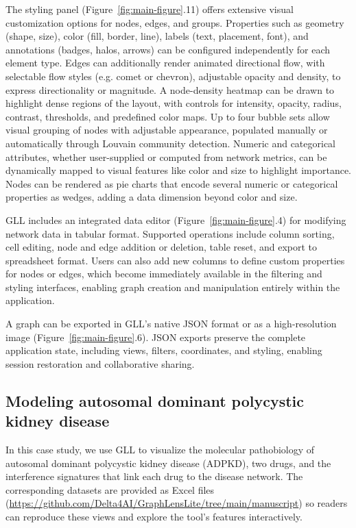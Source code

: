 The styling panel (Figure~\ref{fig:main-figure}.11) offers extensive visual customization options for nodes, edges, and groups. Properties such as geometry (shape, size), color (fill, border, line), labels (text, placement, font), and annotations (badges, halos, arrows) can be configured independently for each element type. Edges can additionally render animated directional flow, with selectable flow styles (e.g. comet or chevron), adjustable opacity and density, to express directionality or magnitude. A node-density heatmap can be drawn to highlight dense regions of the layout, with controls for intensity, opacity, radius, contrast, thresholds, and predefined color maps. Up to four bubble sets allow visual grouping of nodes with adjustable appearance, populated manually or automatically through Louvain community detection. Numeric and categorical attributes, whether user-supplied or computed from network metrics, can be dynamically mapped to visual features like color and size to highlight importance. Nodes can be rendered as pie charts that encode several numeric or categorical properties as wedges, adding a data dimension beyond color and size.

GLL includes an integrated data editor (Figure~\ref{fig:main-figure}.4) for modifying network data in tabular format. Supported operations include column sorting, cell editing, node and edge addition or deletion, table reset, and export to spreadsheet format. Users can also add new columns to define custom properties for nodes or edges, which become immediately available in the filtering and styling interfaces, enabling graph creation and manipulation entirely within the application.

A graph can be exported in GLL's native JSON format or as a high-resolution image (Figure~\ref{fig:main-figure}.6). JSON exports preserve the complete application state, including views, filters, coordinates, and styling, enabling session restoration and collaborative sharing.

\subsection{Modeling autosomal dominant polycystic kidney disease}
In this case study, we use GLL to visualize the molecular pathobiology of autosomal dominant polycystic kidney disease (ADPKD), two drugs, and the interference signatures that link each drug to the disease network. The corresponding datasets are provided as Excel files (\url{https://github.com/Delta4AI/GraphLensLite/tree/main/manuscript}) so readers can reproduce these views and explore the tool's features interactively.

